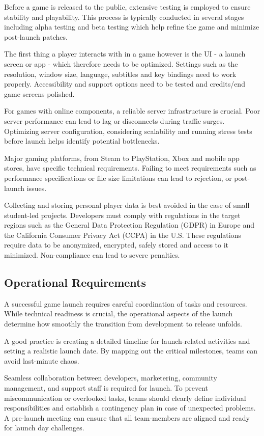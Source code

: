 Before a game is released to the public, extensive testing is employed to ensure stability and playability. This process is typically conducted in several stages including alpha testing and beta testing which help refine the game and minimize post-launch patches.

The first thing a player interacts with in a game however is the UI - a launch screen or app - which therefore needs to be optimized. Settings such as the resolution, window size, language, subtitles and key bindings need to work properly. Accessibility and support options need to be tested and credits/end game screens polished.

For games with online components, a reliable server infrastructure is crucial. Poor server performance can lead to lag or disconnects during traffic surges. Optimizing server configuration, considering scalability and running stress tests before launch helps identify potential bottlenecks.

Major gaming platforms, from Steam to PlayStation, Xbox and mobile app stores, have specific technical requirements. Failing to meet requirements such as performance specifications or file size limitations can lead to rejection, or post-launch issues.

Collecting and storing personal player data is best avoided in the case of small student-led projects. Developers must comply with regulations in the target regions such as the General Data Protection Regulation (GDPR) in Europe and the California Consumer Privacy Act (CCPA) in the U.S. These regulations require data to be anonymized, encrypted, safely stored and access to it minimized. Non-compliance can lead to severe penalties.

\subsection{Operational Requirements}
A successful game launch requires careful coordination of tasks and resources. While technical readiness is crucial, the operational aspects of the launch determine how smoothly the transition from development to release unfolds.

A good practice is creating a detailed timeline for launch-related activities and setting a realistic launch date. By mapping out the critical milestones, teams can avoid last-minute chaos.

Seamless collaboration between developers, marketering, community management, and support staff is required for launch. To prevent miscommunication or overlooked tasks, teams should clearly define individual responsibilities and establish a contingency plan in case of unexpected problems. A pre-launch meeting can ensure that all team-members are aligned and ready for launch day challenges.

